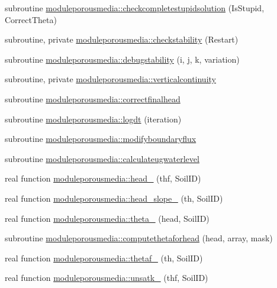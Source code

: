 \begin{DoxyCompactItemize}
\item 
subroutine \mbox{\hyperlink{namespacemoduleporousmedia_ae17de838533d1f706a81845e023fcec8}{moduleporousmedia\+::checkcompletestupidsolution}} (Is\+Stupid, Correct\+Theta)
\item 
subroutine, private \mbox{\hyperlink{namespacemoduleporousmedia_a6005172f093c0d9ccafbe25e15b30383}{moduleporousmedia\+::checkstability}} (Restart)
\item 
subroutine \mbox{\hyperlink{namespacemoduleporousmedia_ab71e22750d7cb57370aeec645454d816}{moduleporousmedia\+::debugstability}} (i, j, k, variation)
\item 
subroutine, private \mbox{\hyperlink{namespacemoduleporousmedia_a406def0f9f49282ca709c13afe389dff}{moduleporousmedia\+::verticalcontinuity}}
\item 
subroutine \mbox{\hyperlink{namespacemoduleporousmedia_ad5fbeb4f9729104026e34d772e57be70}{moduleporousmedia\+::correctfinalhead}}
\item 
subroutine \mbox{\hyperlink{namespacemoduleporousmedia_aefd72c2c51be03528321ec53d37a595c}{moduleporousmedia\+::logdt}} (iteration)
\item 
subroutine \mbox{\hyperlink{namespacemoduleporousmedia_a38214dbc89926ed05dfa7d3831f6fc5a}{moduleporousmedia\+::modifyboundaryflux}}
\item 
subroutine \mbox{\hyperlink{namespacemoduleporousmedia_a3ba8c32bae3dfce05b772d49374e1381}{moduleporousmedia\+::calculateugwaterlevel}}
\item 
real function \mbox{\hyperlink{namespacemoduleporousmedia_a8bee2fc4ac5baf4e997680a0b63e34b3}{moduleporousmedia\+::head\+\_\+}} (thf, Soil\+ID)
\item 
real function \mbox{\hyperlink{namespacemoduleporousmedia_a3c4b0e307933259bb0fd3bb97624a021}{moduleporousmedia\+::head\+\_\+slope\+\_\+}} (th, Soil\+ID)
\item 
real function \mbox{\hyperlink{namespacemoduleporousmedia_a61fe4c9d6a8bf021bfbb5ae3ba5e548e}{moduleporousmedia\+::theta\+\_\+}} (head, Soil\+ID)
\item 
subroutine \mbox{\hyperlink{namespacemoduleporousmedia_a01d07c2251d4f4c42f4f695af824a478}{moduleporousmedia\+::computethetaforhead}} (head, array, mask)
\item 
real function \mbox{\hyperlink{namespacemoduleporousmedia_ada12066e158a338a6444954f0da815e1}{moduleporousmedia\+::thetaf\+\_\+}} (th, Soil\+ID)
\item 
real function \mbox{\hyperlink{namespacemoduleporousmedia_a27a116705cfa7c67ac33a00726529cfa}{moduleporousmedia\+::unsatk\+\_\+}} (thf, Soil\+ID)

\end{DoxyCompactItemize}
